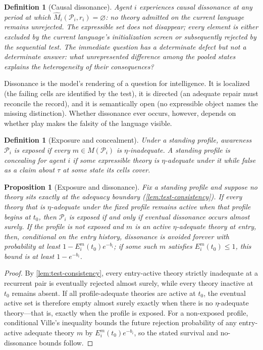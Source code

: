\documentclass[11pt]{article}
\newtheorem{definition}[assumption]{Definition}
\newtheorem{proposition}[assumption]{Proposition}
\theoremstyle{definition}
\newcommand{\emptysetset}{\varnothing}
\begin{document}
\begin{definition}[Causal dissonance]
\label{def:dissonance}
Agent $i$ experiences \emph{causal dissonance} at any period at which $\widehat M_i(\mathcal P_i,r_i)=\emptysetset$: no theory admitted on the current language remains unrejected.
The expressible set does not disappear; every element is either excluded by the current language's initialization screen or subsequently rejected by the sequential test.
The immediate question has a determinate defect but not a determinate answer: \emph{what unrepresented difference among the pooled states explains the heterogeneity of their consequences?}
\end{definition}

Dissonance is the model's rendering of a question for intelligence.
It is localized (the failing cells are identified by the test), it is directed (an adequate repair must reconcile the record), and it is semantically open (no expressible object names the missing distinction).
Whether dissonance ever occurs, however, depends on whether play makes the falsity of the language visible.

\begin{definition}[Exposure and concealment]
\label{def:exposure}
Under a standing profile, awareness $\mathcal P_i$ is \emph{exposed} if every $m\in M(\mathcal P_i)$ is $\eta$-inadequate.
A standing profile is \emph{concealing} for agent $i$ if some expressible theory is $\eta$-adequate under it while false as a claim about $\tau$ at some state its cells cover.
\end{definition}

\begin{proposition}[Exposure and dissonance]
\label{prop:exposure}
Fix a standing profile and suppose no theory sits exactly at the adequacy boundary (\cref{lem:test-consistency}).
If every theory that is $\eta$-adequate under the fixed profile remains active when that profile begins at $t_0$, then $\mathcal P_i$ is exposed if and only if eventual dissonance occurs almost surely.
If the profile is not exposed and $m$ is an active $\eta$-adequate theory at entry, then, conditional on the entry history, dissonance is avoided forever with probability at least $1-E_i^m(t_0)e^{-b_i}$; if some such $m$ satisfies $E_i^m(t_0)\le1$, this bound is at least $1-e^{-b_i}$.
\end{proposition}

\begin{proof}
By \cref{lem:test-consistency}, every entry-active theory strictly inadequate at a recurrent pair is eventually rejected almost surely, while every theory inactive at $t_0$ remains absent.
If all profile-adequate theories are active at $t_0$, the eventual active set is therefore empty almost surely exactly when there is no $\eta$-adequate theory---that is, exactly when the profile is exposed.
For a non-exposed profile, conditional Ville's inequality bounds the future rejection probability of any entry-active adequate theory $m$ by $E_i^m(t_0)e^{-b_i}$, so the stated survival and no-dissonance bounds follow.
\end{proof}
\end{document}

